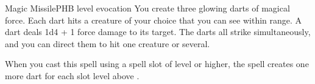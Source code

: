 \begin{spell}{Magic Missile}{PHB}{ level evocation}
{
}
You create three glowing darts of magical force. Each
dart hits a creature of your choice that you can see
within range. A dart deals 1d4 + 1 force damage to its
target. The darts all strike simultaneously, and you can
direct them to hit one creature or several.

 When you cast this spell using a
spell slot of  level or higher, the spell creates one
more dart for each slot level above .
\end{spell}